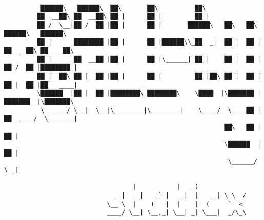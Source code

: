 \documentclass[varwidth=\maxdimen,margin=0.5cm,multi={verbatim}]{standalone}
\begin{document}
\begin{verbatim}

          ██████\   ██████\  ██\       ██\          ██\
         ██  __██\ ██  __██\ ██ |      ██ |         ██ |
         ██ /  \__|██ /  ██ |██ |      ██ |       ██████\   ██\   ██\  ██████\   ██████\
         ██ |      ████████ |██ |      ██ |██████\\_██  _|  ██ |  ██ |██  __██\ ██  __██\
         ██ |      ██  __██ |██ |      ██ |\______| ██ |    ██ |  ██ |██ /  ██ |████████ |
         ██ |  ██\ ██ |  ██ |██ |      ██ |         ██ |██\ ██ |  ██ |██ |  ██ |██   ____|
         \██████  |██ |  ██ |████████\ ████████\    \████  |\███████ |███████  |\███████\
          \______/ \__|  \__|\________|\________|    \____/  \____██ |██  ____/  \_______|
                                                            ██\   ██ |██ |
                                                            \██████  |██ |
                                                             \______/ \__|

                                   |           |   _)
                              __|  __|   _` |  __|  |   __| \ \  /
                            \__ \  |    (   |  |    |  (     `  <
                            ____/ \__| \__,_| \__| _| \___|  _/\_\



\end{verbatim}
\end{document}
